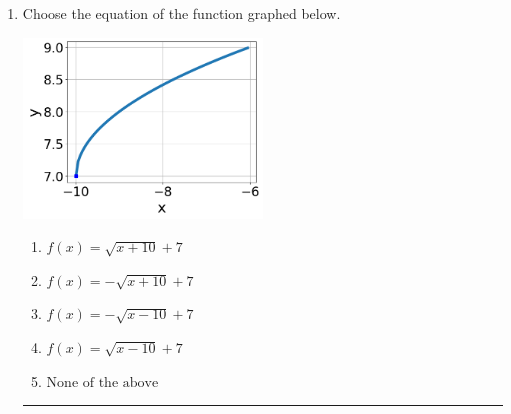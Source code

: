 \documentclass[14pt]{extbook}
\newcommand{\litem}[1]{\item#1\hspace*{-1cm}\rule{\textwidth}{0.4pt}}
\begin{document}
\begin{enumerate}
{\begin{enumerate}[label=\Alph*.]
\end{enumerate} }
\litem{
Choose the equation of the function graphed below.
\begin{center}
    \includegraphics[width=0.5\textwidth]{../Figures/radicalGraphToEquationCopyA.png}
\end{center}
\begin{enumerate}[label=\Alph*.]
\item \( f(x) = \sqrt{x + 10} + 7 \)
\item \( f(x) = - \sqrt{x + 10} + 7 \)
\item \( f(x) = - \sqrt{x - 10} + 7 \)
\item \( f(x) = \sqrt{x - 10} + 7 \)
\item \( \text{None of the above} \)


\end{enumerate}}
\end{enumerate}
\end{document}
